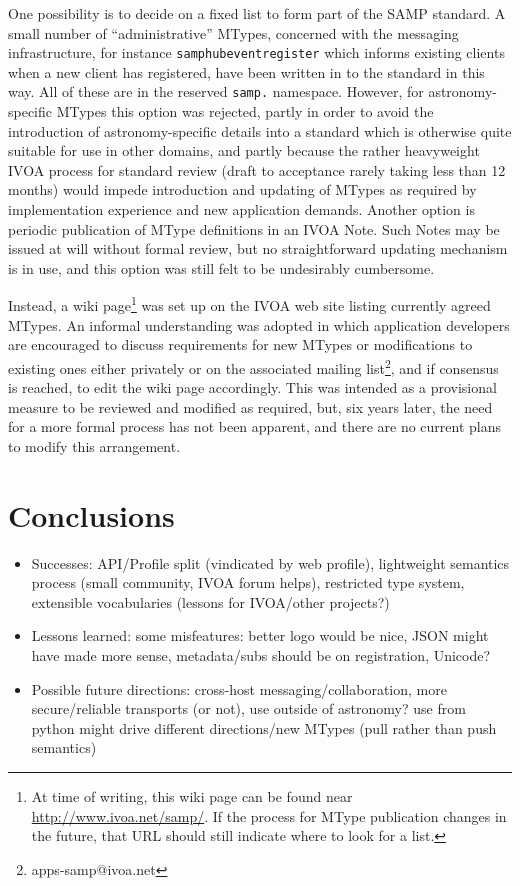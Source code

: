 \documentclass[5p]{elsarticle}
\newcommand{\todo}{\color{gray}}
\begin{document}
One possibility
is to decide on a fixed list to form part of the SAMP standard.
A small number of ``administrative'' MTypes,
concerned with the messaging infrastructure,
for instance {\tt samp{\kdot}hub{\kdot}event{\kdot}register}
which informs existing clients when a new client has registered,
have been written in to the standard in this way.
All of these are in the reserved {\tt samp.} namespace.
However, for astronomy-specific MTypes this option was rejected,
partly in order to avoid the introduction of astronomy-specific details
into a standard which is otherwise quite suitable for use in other domains,
and partly because the rather heavyweight IVOA process for
standard review \citep{ivoadoc}
(draft to acceptance rarely taking less than 12 months)
would impede introduction and updating of MTypes as required
by implementation experience and new application demands.
Another option is periodic publication of MType definitions
in an IVOA Note.  Such Notes may be issued at will without formal review,
but no straightforward updating mechanism is in use,
and this option was still felt to be undesirably cumbersome.

Instead, a wiki page\footnote{
  At time of writing, this wiki page can be found near
  \url{http://www.ivoa.net/samp/}.
  If the process for MType publication changes in the future,
  that URL should still indicate where to look for a list.}
was set up on the IVOA web site listing currently agreed MTypes.
An informal understanding was adopted in which
application developers are encouraged to discuss requirements for
new MTypes or modifications to existing ones either privately or
on the associated mailing list\footnote{apps-samp@ivoa.net}, 
and if consensus is reached, to edit the wiki page accordingly.
This was intended as a provisional measure to be reviewed and
modified as required, but, six years later, the need for a more
formal process has not been apparent, and there are no current
plans to modify this arrangement.

\section{Conclusions} \label{sec:conclusion}

{\todo
\begin{itemize}
\item Successes:
      API/Profile split (vindicated by web profile),
      lightweight semantics process (small community, IVOA forum helps),
      restricted type system,
      extensible vocabularies
      (lessons for IVOA/other projects?)
\item Lessons learned:
      some misfeatures: better logo would be nice,
      JSON might have made more sense,
      metadata/subs should be on registration,
      Unicode?
\item Possible future directions:
      cross-host messaging/collaboration,
      more secure/reliable transports (or not),
      use outside of astronomy?
      use from python might drive different directions/new MTypes
         (pull rather than push semantics)
\end{itemize}
}
\end{document}
